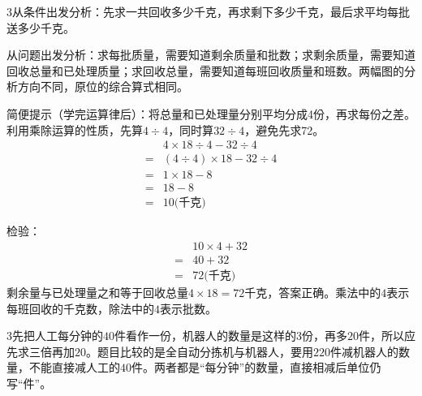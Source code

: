 \documentclass[multi=snippet,border={5bp 20bp 5bp 5bp}]{standalone}
\newenvironment{snippet}[3]{\begin{minipage}{#1bp}\color{answerred}\fontsize{#2}{#3}\selectfont\raggedright}{\end{minipage}}
\begin{document}
\begin{snippet}{505}{11.5}{14}\begin{multicols}{3}\raggedcolumns 从条件出发分析：先求一共回收多少千克，再求剩下多少千克，最后求平均每批送多少千克。\par 从问题出发分析：求每批质量，需要知道剩余质量和批数；求剩余质量，需要知道回收总量和已处理质量；求回收总量，需要知道每班回收质量和班数。两幅图的分析方向不同，原位的综合算式相同。\par 简便提示（学完运算律后）：将总量和已处理量分别平均分成4份，再求每份之差。利用乘除运算的性质，先算\(4\div4\)\allowbreak ，同时算\(32\div4\)\allowbreak ，避免先求72。\[\begin{aligned}&4\times18\div4-32\div4\\={}&(4\div4)\times18-32\div4\\={}&1\times18-8\\={}&18-8\\={}&10\text{(千克)}\end{aligned}\]\par 检验：\[\begin{aligned}&10\times4+32\\={}&40+32\\={}&72\text{(千克)}\end{aligned}\]剩余量与已处理量之和等于回收总量\(4\times18=72\)\allowbreak 千克，答案正确。乘法中的\(4\)\allowbreak 表示每班回收的千克数，除法中的\(4\)\allowbreak 表示批数。\end{multicols}\end{snippet}
\begin{snippet}{505}{11.5}{14}\begin{multicols}{3}\raggedcolumns 先把人工每分钟的\(40\)\allowbreak 件看作一份，机器人的数量是这样的\(3\)\allowbreak 份，再多\(20\)\allowbreak 件，所以应先求三倍再加\(20\)\allowbreak 。题目比较的是全自动分拣机与机器人，要用\(220\)\allowbreak 件减机器人的数量，不能直接减人工的\(40\)\allowbreak 件。两者都是“每分钟”的数量，直接相减后单位仍写“件”。\end{multicols}\end{snippet}
\end{document}
